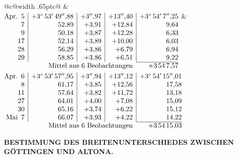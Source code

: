 \noindent\begin{tabular}{@{}c@{\hspace{.4em}\vrule width .65pt\hspace{.4em}}c@{}}
 &
 \\[.18ex]
\(\begin{array}[t]{@{}r|r|r|r|r@{}}
\text{Apr.}\enspace 5 & +3^\circ\,53'\,49''{,}88 & +3''{,}97 & +13''{,}40 & +3^\circ\,54'\,7''{,}25\\
7 & 52{,}89 & +3{,}91 & +12{,}84 & 9{,}64\\
9 & 50{,}18 & +3{,}87 & +12{,}28 & 6{,}33\\
17 & 52{,}14 & +3{,}89 & +10{,}00 & 6{,}03\\
28 & 56{,}29 & +3{,}86 & +6{,}79 & 6{,}94\\
29 & 58{,}85 & +3{,}86 & +6{,}51 & 9{,}22\\
\cline{5-5}
\multicolumn{4}{r}{\text{Mittel aus 6 Beobachtungen}} & +3\,54\,7{,}57
\end{array}\)
&
\(\begin{array}[t]{@{}r|r|r|r|r@{}}
\text{Apr.}\enspace 6 & +3^\circ\,53'\,57''{,}95 & +3''{,}94 & +13''{,}12 & +3^\circ\,54'\,15''{,}01\\
8 & 61{,}17 & +3{,}85 & +12{,}56 & 17{,}58\\
11 & 57{,}64 & +3{,}82 & +11{,}72 & 13{,}18\\
27 & 64{,}01 & +4{,}00 & +7{,}08 & 15{,}09\\
30 & 65{,}16 & +3{,}74 & +6{,}22 & 15{,}12\\
\text{Mai}\enspace 7 & 66{,}07 & +3{,}93 & +4{,}22 & 14{,}22\\
\cline{5-5}
\multicolumn{4}{r}{\text{Mittel aus 6 Beobachtungen}} & +3\,54\,15{,}03
\end{array}\)
\end{tabular}\par\medskip

\par\clearpage
\noindent{}\parbox[t]{\dimexpr\linewidth-24mm\relax}{\centering\scriptsize\bfseries BESTIMMUNG DES BREITENUNTERSCHIEDES ZWISCHEN GÖTTINGEN UND ALTONA.}\makebox[12mm][r]{}\par\medskip

